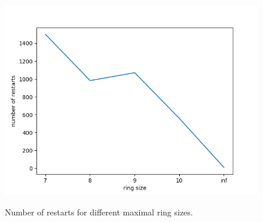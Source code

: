 \begin{figure}[h]
	\begin{centering}
		{\includegraphics[scale=0.8]{figures/approach/restarts.png}}
		\caption{Number of restarts for different maximal ring sizes.}
		\label{fig:restarts}
	\end{centering}
\end{figure}
